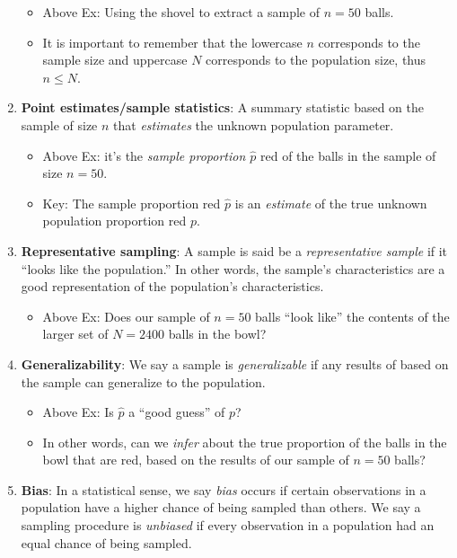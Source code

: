 \documentclass[12pt,]{krantz}
\providecommand{\tightlist}{%
  \setlength{\itemsep}{0pt}\setlength{\parskip}{0pt}}
\theoremstyle{definition}
\theoremstyle{definition}
\theoremstyle{definition}
\theoremstyle{remark}
\begin{document}
\begin{enumerate}
  \begin{itemize}
  \tightlist
  \item
    Above Ex: Using the shovel to extract a sample of \(n=50\) balls.
  \item
    It is important to remember that the lowercase \(n\) corresponds to
    the sample size and uppercase \(N\) corresponds to the population
    size, thus \(n \leq N\).
  \end{itemize}
\item
  \textbf{Point estimates/sample statistics}: A summary statistic based
  on the sample of size \(n\) that \emph{estimates} the unknown
  population parameter.

  \begin{itemize}
  \tightlist
  \item
    Above Ex: it's the \emph{sample proportion \(\widehat{p}\)} red of
    the balls in the sample of size \(n=50\).
  \item
    Key: The sample proportion red \(\widehat{p}\) is an \emph{estimate}
    of the true unknown population proportion red \(p\).
  \end{itemize}
\item
  \textbf{Representative sampling}: A sample is said be a
  \emph{representative sample} if it ``looks like the population.'' In
  other words, the sample's characteristics are a good representation of
  the population's characteristics.

  \begin{itemize}
  \tightlist
  \item
    Above Ex: Does our sample of \(n=50\) balls ``look like'' the
    contents of the larger set of \(N=2400\) balls in the bowl?
  \end{itemize}
\item
  \textbf{Generalizability}: We say a sample is \emph{generalizable} if
  any results of based on the sample can generalize to the population.

  \begin{itemize}
  \tightlist
  \item
    Above Ex: Is \(\widehat{p}\) a ``good guess'' of \(p\)?
  \item
    In other words, can we \emph{infer} about the true proportion of the
    balls in the bowl that are red, based on the results of our sample
    of \(n=50\) balls?
  \end{itemize}
\item
  \textbf{Bias}: In a statistical sense, we say \emph{bias} occurs if
  certain observations in a population have a higher chance of being
  sampled than others. We say a sampling procedure is \emph{unbiased} if
  every observation in a population had an equal chance of being
  sampled.


\end{enumerate}
\end{document}
